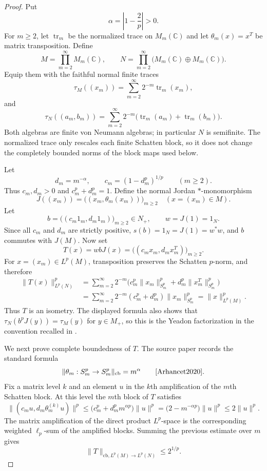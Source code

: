 \documentclass[11pt]{amsart}
\theoremstyle{remark}
\newcommand{\cb}{\mathrm{cb}}
\newcommand{\tr}{\operatorname{tr}}
\newcommand{\C}{\mathbb C}
\newcommand{\Lp}{L^p}
\newcommand{\Sp}{S^p}
\begin{document}
\begin{proof}
Put
\[
        \alpha=\left|1-\frac{2}{p}\right|>0.
\]
For $m\geq2$, let $\tr_m$ be the normalized trace on $M_m(\C)$ and let
$\theta_m(x)=x^T$ be matrix transposition.  Define
\[
        M=\prod_{m=2}^{\infty} M_m(\C),\qquad
        N=\prod_{m=2}^{\infty}\bigl(M_m(\C)\oplus M_m(\C)\bigr).
\]
Equip them with the faithful normal finite traces
\[
        \tau_M((x_m))=\sum_{m=2}^{\infty}2^{-m}\tr_m(x_m),
\]
and
\[
        \tau_N((a_m,b_m))
        =\sum_{m=2}^{\infty}2^{-m}\bigl(\tr_m(a_m)+\tr_m(b_m)\bigr).
\]
Both algebras are finite von Neumann algebras; in particular $N$ is
semifinite.  The normalized trace only rescales each finite Schatten block, so
it does not change the completely bounded norms of the block maps used below.

Let
\[
        d_m=m^{-\alpha},\qquad
        c_m=(1-d_m^p)^{1/p}\qquad(m\geq2).
\]
Thus $c_m,d_m>0$ and $c_m^p+d_m^p=1$.  Define the normal Jordan
$*$-monomorphism
\[
        J((x_m))=\bigl((x_m,\theta_m(x_m))\bigr)_{m\geq2}
        \quad (x=(x_m)\in M).
\]
Let
\[
        b=\bigl((c_m1_m,d_m1_m)\bigr)_{m\geq2}\in N_+,\qquad
        w=J(1)=1_N.
\]
Since all $c_m$ and $d_m$ are strictly positive, $s(b)=1_N=J(1)=w^*w$, and
$b$ commutes with $J(M)$.  Now set
\[
        T(x)=wbJ(x)
        =\bigl((c_mx_m,d_mx_m^T)\bigr)_{m\geq2}.
\]
For $x=(x_m)\in\Lp(M)$, transposition preserves the Schatten $p$-norm, and
therefore
\[
\begin{aligned}
 \|T(x)\|_{\Lp(N)}^p
 &=\sum_{m=2}^{\infty}2^{-m}
        \bigl(c_m^p\|x_m\|_{\Sp_m}^p+d_m^p\|x_m^T\|_{\Sp_m}^p\bigr) \\
 &=\sum_{m=2}^{\infty}2^{-m}(c_m^p+d_m^p)\|x_m\|_{\Sp_m}^p
  =\|x\|_{\Lp(M)}^p .
\end{aligned}
\]
Thus $T$ is an isometry.  The displayed formula also shows that
$\tau_N(b^pJ(y))=\tau_M(y)$ for $y\in M_+$, so this is the Yeadon
factorization in the convention recalled in \cite[Section 2]{Arhancet2020}.

We next prove complete boundedness of $T$.  The source paper records the
standard formula
\[
        \|\theta_m:\Sp_m\to\Sp_m\|_{\cb}=m^{\alpha}
        \qquad\text{\cite[p. 7]{Arhancet2020}}.
\]
Fix a matrix level $k$ and an element $u$ in the $k$th amplification of the
$m$th Schatten block.  At this level the $m$th block of $T$ satisfies
\[
 \|(c_mu,d_m\theta_m^{(k)}u)\|^p
 \leq
 \bigl(c_m^p+d_m^pm^{\alpha p}\bigr)\|u\|^p
 =
 \bigl(2-m^{-\alpha p}\bigr)\|u\|^p
 \leq 2\|u\|^p .
\]
The matrix amplification of the direct product $L^p$-space is the corresponding
weighted $\ell_p$-sum of the amplified blocks.  Summing the previous estimate
over $m$ gives
\[
        \|T\|_{\cb,\Lp(M)\to\Lp(N)}\leq 2^{1/p}.
\]


\end{proof}
\end{document}
